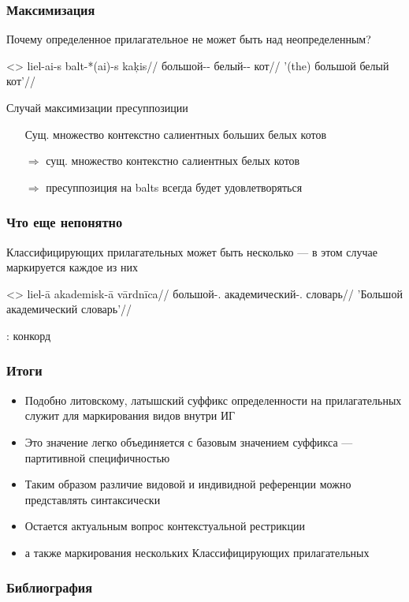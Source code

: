 \documentclass[9pt, t]{beamer}
\begin{document}
\begin{frame}
    \frametitle{Максимизация}

    Почему определенное прилагательное не может быть над неопределенным?

    \ex<>
        \begingl
            \gla liel-ai-s balt-*(ai)-s kaķis//
            \glb большой-\Def-\Nom{} белый-\Def-\Nom{} кот//
            \glft '(the) большой белый кот'//
        \endgl
    \xe

    \pause
    
    Случай максимизации пресуппозиции \citep{heim1991, copbeav2015}
    \begin{itemize}
        \item[] Сущ. множество контекстно салиентных больших белых котов 
        \item[$\Rightarrow$] сущ. множество контекстно салиентных белых котов 
        \item[$\Rightarrow$] пресуппозиция на balts всегда будет удовлетворяться
    \end{itemize}

\end{frame}

\begin{frame}
    \frametitle{Что еще непонятно}

    Классифицирующих прилагательных может быть несколько — в этом случае маркируется каждое из них

    \ex<>
        \begingl
            \gla liel-ā akademisk-ā vārdnīca//
            \glb большой-\Def.\F{} академический-\Def.\F{} словарь//
            \glft 'Большой академический словарь'//
        \endgl
    \xe

    \citep{sereikaite2017}: конкорд

\end{frame}

\begin{frame}
    \frametitle{Итоги}

    \begin{itemize}
        \item Подобно литовскому, латышский суффикс определенности на прилагательных служит для маркирования видов внутри ИГ
        \item Это значение легко объединяется с базовым значением суффикса — партитивной специфичностью
        \item Таким образом различие видовой и индивидной референции можно представлять синтаксически
        \item Остается актуальным вопрос контекстуальной рестрикции
        \item а также маркирования нескольких Классифицирующих прилагательных
    \end{itemize}

\end{frame}

\begin{frame}
    \frametitle{Библиография}

    {\footnotesize }

\end{frame}
\end{document}
